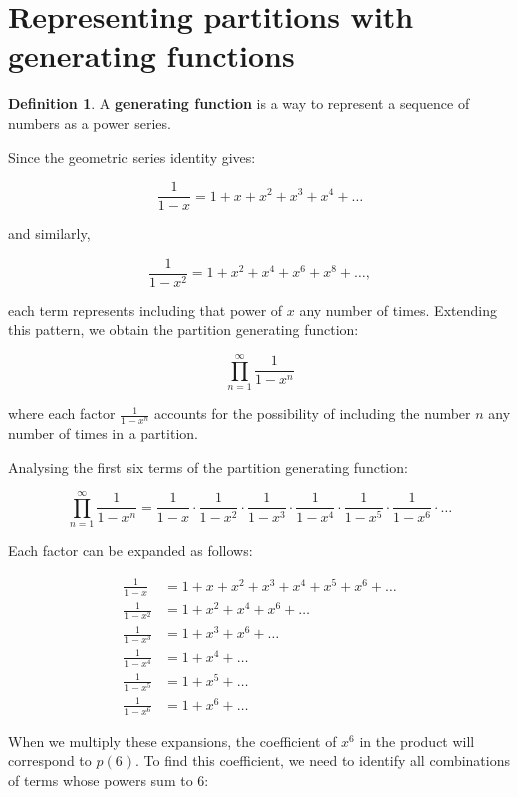 \documentclass{article}
\theoremstyle{definition}
\newtheorem{definition}{Definition}
\begin{document}
\section{Representing partitions with generating functions}

\begin{definition}
    A \textbf{generating function} is a way to represent a sequence of numbers as a power series. 
\end{definition}

\noindent
Since the geometric series identity gives:

\[
\frac{1}{1 - x} = 1 + x + x^2 + x^3 + x^4 + \dots
\]

\noindent
and similarly,

\[
\frac{1}{1 - x^2} = 1 + x^2 + x^4 + x^6 + x^8 + \dots,
\]

\noindent
each term represents including that power of \( x \) any number of times. Extending this pattern, we obtain
the partition generating function:

\[
\prod_{n=1}^{\infty} \frac{1}{1 - x^n}
\]

\noindent
where each factor \( \frac{1}{1 - x^n} \) accounts for the possibility of including the number \( n \) any
number of times in a partition.

\newpage

\noindent
Analysing the first six terms of the partition generating function:

\[
\prod_{n=1}^{\infty} \frac{1}{1 - x^n} = \frac{1}{1-x} \cdot \frac{1}{1-x^2} \cdot \frac{1}{1-x^3} \cdot \frac{1}{1-x^4} \cdot \frac{1}{1-x^5} \cdot \frac{1}{1-x^6} \cdot \dots
\]

\noindent
Each factor can be expanded as follows:

\[
\begin{aligned}
\frac{1}{1-x} &= 1 + x + x^2 + x^3 + x^4 + x^5 + x^6 + \dots \\
\frac{1}{1-x^2} &= 1 + x^2 + x^4 + x^6 + \dots \\
\frac{1}{1-x^3} &= 1 + x^3 + x^6 + \dots \\
\frac{1}{1-x^4} &= 1 + x^4 + \dots \\
\frac{1}{1-x^5} &= 1 + x^5 + \dots \\
\frac{1}{1-x^6} &= 1 + x^6 + \dots
\end{aligned}
\]

\noindent
When we multiply these expansions, the coefficient of $x^6$ in the product will correspond to $p(6)$. To find this coefficient, we need to identify all combinations of terms whose powers sum to 6:
\end{document}
